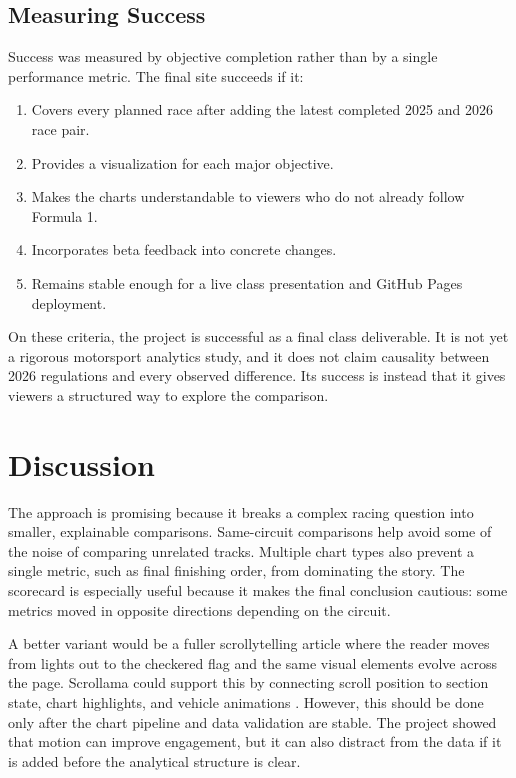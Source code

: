 \documentclass[conference]{IEEEtran}
\begin{document}
\subsection{Measuring Success}
Success was measured by objective completion rather than by a single performance metric. The final site succeeds if it:
\begin{enumerate}
    \item Covers every planned race after adding the latest completed 2025 and 2026 race pair.
    \item Provides a visualization for each major objective.
    \item Makes the charts understandable to viewers who do not already follow Formula 1.
    \item Incorporates beta feedback into concrete changes.
    \item Remains stable enough for a live class presentation and GitHub Pages deployment.
\end{enumerate}

On these criteria, the project is successful as a final class deliverable. It is not yet a rigorous motorsport analytics study, and it does not claim causality between 2026 regulations and every observed difference. Its success is instead that it gives viewers a structured way to explore the comparison.

\section{Discussion}
The approach is promising because it breaks a complex racing question into smaller, explainable comparisons. Same-circuit comparisons help avoid some of the noise of comparing unrelated tracks. Multiple chart types also prevent a single metric, such as final finishing order, from dominating the story. The scorecard is especially useful because it makes the final conclusion cautious: some metrics moved in opposite directions depending on the circuit.

A better variant would be a fuller scrollytelling article where the reader moves from lights out to the checkered flag and the same visual elements evolve across the page. Scrollama could support this by connecting scroll position to section state, chart highlights, and vehicle animations \cite{scrollama}. However, this should be done only after the chart pipeline and data validation are stable. The project showed that motion can improve engagement, but it can also distract from the data if it is added before the analytical structure is clear.
\end{document}
